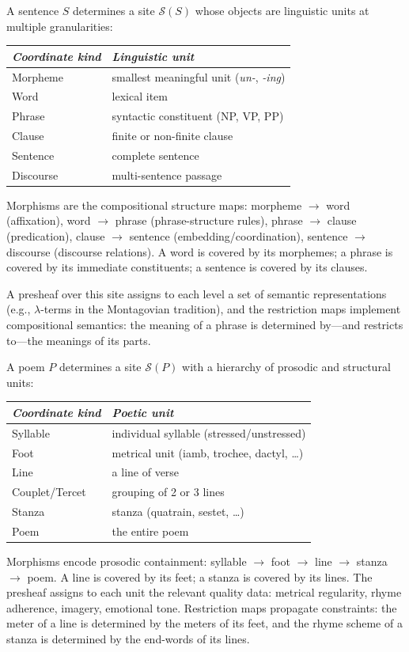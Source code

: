 \begin{example}
\label{ex:site:nl}
A sentence $S$ determines a site $\mathcal{S}(S)$ whose objects are
linguistic units at multiple granularities:
\begin{center}
\begin{tabular}{ll}
\emph{Coordinate kind} & \emph{Linguistic unit} \\
\hline
Morpheme  & smallest meaningful unit (\emph{un-}, \emph{-ing}) \\
Word      & lexical item \\
Phrase    & syntactic constituent (NP, VP, PP) \\
Clause    & finite or non-finite clause \\
Sentence  & complete sentence \\
Discourse & multi-sentence passage
\end{tabular}
\end{center}
Morphisms are the compositional structure maps: morpheme $\to$ word
(affixation), word $\to$ phrase (phrase-structure rules), phrase $\to$
clause (predication), clause $\to$ sentence (embedding/coordination),
sentence $\to$ discourse (discourse relations).  A word is covered by
its morphemes; a phrase is covered by its immediate constituents; a
sentence is covered by its clauses.

A presheaf over this site assigns to each level a set of semantic
representations (e.g., $\lambda$-terms in the Montagovian tradition),
and the restriction maps implement compositional semantics: the
meaning of a phrase is determined by---and restricts to---the meanings
of its parts.
\end{example}

\begin{example}[Poetry]
\label{ex:site:poetry}
A poem $P$ determines a site $\mathcal{S}(P)$ with a hierarchy of
prosodic and structural units:
\begin{center}
\begin{tabular}{ll}
\emph{Coordinate kind} & \emph{Poetic unit} \\
\hline
Syllable & individual syllable (stressed/unstressed) \\
Foot     & metrical unit (iamb, trochee, dactyl, \ldots) \\
Line     & a line of verse \\
Couplet/Tercet & grouping of 2 or 3 lines \\
Stanza   & stanza (quatrain, sestet, \ldots) \\
Poem     & the entire poem
\end{tabular}
\end{center}
Morphisms encode prosodic containment: syllable $\to$ foot $\to$ line
$\to$ stanza $\to$ poem.  A line is covered by its feet; a stanza is
covered by its lines.  The presheaf assigns to each unit the relevant
quality data: metrical regularity, rhyme adherence, imagery, emotional
tone.  Restriction maps propagate constraints: the meter of a line is
determined by the meters of its feet, and the rhyme scheme of a stanza
is determined by the end-words of its lines.
\end{example}

